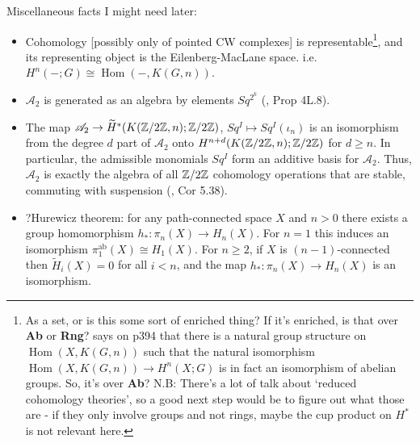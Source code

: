\documentclass{MetricNotes2023}
\def\inte{\ensuremath\mathbb{Z}}
\DeclareMathOperator{\Hom}{Hom}
\begin{document}
Miscellaneous facts I might need later:
\begin{itemize}
\item Cohomology [possibly only of pointed %
CW complexes] is representable\footnote{As a set, or is this some sort of enriched thing? If it's enriched, is that over \textbf{Ab} or \textbf{Rng}? \autocite{hatcher} says on p394 that there is a natural group structure on \(\Hom(X,K(G,n))\) such that the natural isomorphism \(\Hom(X,K(G,n))\to H^n(X;G)\) is in fact an isomorphism of abelian groups. So, it's over \textbf{Ab}? N.B: There's a lot of talk about `reduced cohomology theories', so a good next step would be to figure out what those are - if they only involve groups and not rings, maybe the cup product on \(H^*\) is not relevant here.}, and its representing object is the Eilenberg-MacLane space.  i.e. \(H^n(-; G)\cong \Hom(-, K(G, n))\). 
\item \(\mathscr A_2\) is generated as an algebra by elements \(Sq^{2^k}\) (\autocite{hatcher}, Prop 4L.8).
\item The map \(\mathscr A_2 \to \widetilde H^*(K(\inte/2\inte, n); \inte/2\inte)\), \(Sq^I\mapsto Sq^I(\iota_n)\) is an isomorphism from the degree \(d\) part of \(\mathscr A_2\) onto \(H^{n+d}(K(\inte/2\inte, n); \inte/2\inte)\) for \(d \geq n\). In particular, the admissible monomials \(Sq^I\) form an additive basis for \(\mathscr A_2\). Thus, \(\mathscr A_2\) is exactly the algebra of all \(\inte/2\inte\) cohomology operations that are stable, commuting with suspension (\autocite{hatcher5}, Cor 5.38). 

\item ?Hurewicz theorem: for any path-connected space \(X\) and \(n>0\) there exists a group homomorphism \(h_* : \pi_n(X)\to H_n(X)\). For \(n=1\) this induces an isomorphism \(\pi_1^{\text{ab}}(X)\cong H_1(X)\). For \(n \geq 2\), if \(X\) is \((n-1)\)-connected then \(\widetilde H_i(X)=0\) for all \(i<n\), and the map \(h_* : \pi_n(X)\to H_n(X)\) is an isomorphism. 


\end{itemize}
\end{document}
